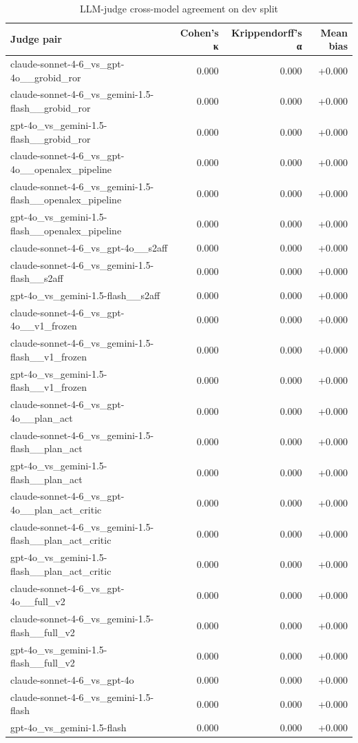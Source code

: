 \begin{table}[ht]
  \centering
  \caption{LLM-judge cross-model agreement on dev split}
  \label{tab:judge_agreement}
  \begin{tabular}{lrrr}
    \toprule
    Judge pair & Cohen's κ & Krippendorff's α & Mean bias \\
    \midrule
    claude-sonnet-4-6\_vs\_gpt-4o\_\_grobid\_ror & 0.000 & 0.000 & +0.000 \\
    claude-sonnet-4-6\_vs\_gemini-1.5-flash\_\_grobid\_ror & 0.000 & 0.000 & +0.000 \\
    gpt-4o\_vs\_gemini-1.5-flash\_\_grobid\_ror & 0.000 & 0.000 & +0.000 \\
    claude-sonnet-4-6\_vs\_gpt-4o\_\_openalex\_pipeline & 0.000 & 0.000 & +0.000 \\
    claude-sonnet-4-6\_vs\_gemini-1.5-flash\_\_openalex\_pipeline & 0.000 & 0.000 & +0.000 \\
    gpt-4o\_vs\_gemini-1.5-flash\_\_openalex\_pipeline & 0.000 & 0.000 & +0.000 \\
    claude-sonnet-4-6\_vs\_gpt-4o\_\_s2aff & 0.000 & 0.000 & +0.000 \\
    claude-sonnet-4-6\_vs\_gemini-1.5-flash\_\_s2aff & 0.000 & 0.000 & +0.000 \\
    gpt-4o\_vs\_gemini-1.5-flash\_\_s2aff & 0.000 & 0.000 & +0.000 \\
    claude-sonnet-4-6\_vs\_gpt-4o\_\_v1\_frozen & 0.000 & 0.000 & +0.000 \\
    claude-sonnet-4-6\_vs\_gemini-1.5-flash\_\_v1\_frozen & 0.000 & 0.000 & +0.000 \\
    gpt-4o\_vs\_gemini-1.5-flash\_\_v1\_frozen & 0.000 & 0.000 & +0.000 \\
    claude-sonnet-4-6\_vs\_gpt-4o\_\_plan\_act & 0.000 & 0.000 & +0.000 \\
    claude-sonnet-4-6\_vs\_gemini-1.5-flash\_\_plan\_act & 0.000 & 0.000 & +0.000 \\
    gpt-4o\_vs\_gemini-1.5-flash\_\_plan\_act & 0.000 & 0.000 & +0.000 \\
    claude-sonnet-4-6\_vs\_gpt-4o\_\_plan\_act\_critic & 0.000 & 0.000 & +0.000 \\
    claude-sonnet-4-6\_vs\_gemini-1.5-flash\_\_plan\_act\_critic & 0.000 & 0.000 & +0.000 \\
    gpt-4o\_vs\_gemini-1.5-flash\_\_plan\_act\_critic & 0.000 & 0.000 & +0.000 \\
    claude-sonnet-4-6\_vs\_gpt-4o\_\_full\_v2 & 0.000 & 0.000 & +0.000 \\
    claude-sonnet-4-6\_vs\_gemini-1.5-flash\_\_full\_v2 & 0.000 & 0.000 & +0.000 \\
    gpt-4o\_vs\_gemini-1.5-flash\_\_full\_v2 & 0.000 & 0.000 & +0.000 \\
    claude-sonnet-4-6\_vs\_gpt-4o & 0.000 & 0.000 & +0.000 \\
    claude-sonnet-4-6\_vs\_gemini-1.5-flash & 0.000 & 0.000 & +0.000 \\
    gpt-4o\_vs\_gemini-1.5-flash & 0.000 & 0.000 & +0.000 \\
    \bottomrule
  \end{tabular}
\end{table}